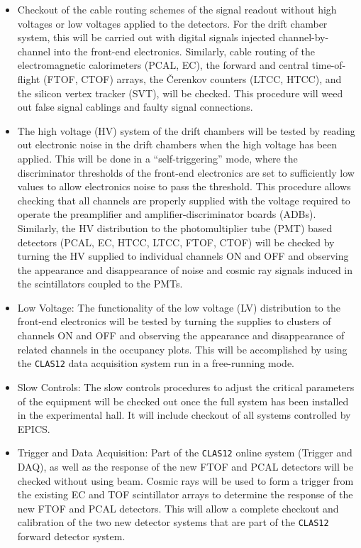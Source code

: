 \begin{itemize}

\item Checkout of the cable routing schemes of the signal readout without
high voltages or low voltages applied to the detectors.  For the
drift chamber system, this will be carried out with digital signals
injected channel-by-channel into the front-end electronics.  Similarly,
cable routing of the electromagnetic calorimeters (PCAL, EC), the forward
and central time-of-flight (FTOF, CTOF) arrays, the {\v C}erenkov
counters (LTCC, HTCC), and the silicon vertex tracker (SVT), will be
checked.  This procedure will weed out false signal cablings and
faulty signal connections.

\item The high voltage (HV) system of the drift chambers will be tested
by reading out electronic noise in the drift chambers when the high
voltage has been applied.  This will be done in a ``self-triggering'' mode,
where the discriminator thresholds of the front-end electronics are set
to sufficiently low values to allow electronics noise to pass the
threshold.  This procedure allows checking that all channels are properly
supplied with the voltage required to operate the preamplifier and
amplifier-discriminator boards (ADBs).  Similarly, the HV distribution
to the photomultiplier tube (PMT) based detectors (PCAL, EC, HTCC, LTCC,
FTOF, CTOF) will be checked by turning the HV supplied to individual
channels ON and OFF and observing the appearance and disappearance of
noise and cosmic ray signals induced in the scintillators coupled to
the PMTs.

\item Low Voltage: The functionality of the low voltage (LV) distribution
to the front-end electronics will be tested by turning the supplies to
clusters of channels ON and OFF and observing the appearance and
disappearance of related channels in the occupancy plots.  This will be
accomplished by using the {\tt CLAS12} data acquisition system run in a 
free-running mode.

\item Slow Controls: The slow controls procedures to adjust the critical
parameters of the equipment will be checked out once the full system has
been installed in the experimental hall.  It will include checkout of
all systems controlled by EPICS.

\item Trigger and Data Acquisition: Part of the {\tt CLAS12} online system
(Trigger and DAQ), as well as the response of the new FTOF and PCAL
detectors will be checked without using beam.  Cosmic rays will be used
to form a trigger from the existing EC and TOF scintillator arrays to
determine the response of the new FTOF and PCAL detectors.  This will
allow a complete checkout and calibration of the two new detector
systems that are part of the {\tt CLAS12} forward detector system.


\end{itemize}
